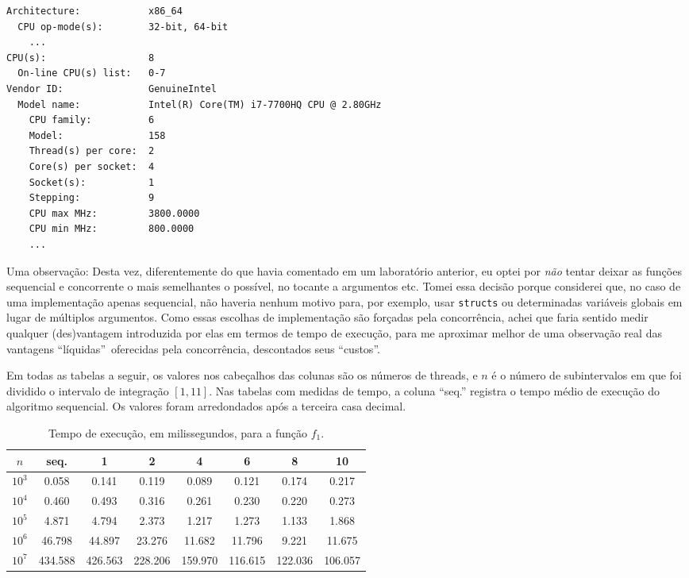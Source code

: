 \documentclass{article}
\begin{document}
\begin{lstlisting}
Architecture:            x86_64
  CPU op-mode(s):        32-bit, 64-bit
    ...
CPU(s):                  8
  On-line CPU(s) list:   0-7
Vendor ID:               GenuineIntel
  Model name:            Intel(R) Core(TM) i7-7700HQ CPU @ 2.80GHz
    CPU family:          6
    Model:               158
    Thread(s) per core:  2
    Core(s) per socket:  4
    Socket(s):           1
    Stepping:            9
    CPU max MHz:         3800.0000
    CPU min MHz:         800.0000
    ...
\end{lstlisting}

  Uma observação: Desta vez, diferentemente do que havia comentado em um laboratório anterior, eu optei por \emph{não} tentar deixar as funções sequencial e concorrente o mais semelhantes o possível, no tocante a argumentos etc. Tomei essa decisão porque considerei que, no caso de uma implementação apenas sequencial, não haveria nenhum motivo para, por exemplo, usar \texttt{structs} ou determinadas variáveis globais em lugar de múltiplos argumentos. Como essas escolhas de implementação são forçadas pela concorrência, achei 
  que faria sentido medir qualquer (des)vantagem introduzida por elas 
  em termos de tempo de execução, para me aproximar melhor de uma 
  observação real das vantagens ``líquidas''\ oferecidas pela concorrência, descontados seus ``custos''.

  Em todas as tabelas a seguir, os valores nos cabeçalhos das colunas são os números de threads, e $n$ é o número de subintervalos em que foi dividido o intervalo de integração $[1, 11]$. Nas tabelas com medidas de tempo, a coluna ``seq.'' registra o tempo médio de execução do algoritmo sequencial. Os valores foram arredondados após a terceira casa decimal.

  \begin{table}[h!]
    \centering
    \begin{tabular}{||c c c c c c c c||}
      \hline
      $n$ & seq. & 1 & 2 & 4 & 6 & 8 & 10 \\ 
      \hline \hline
      $10^{3}$ & 0.058 & 0.141 & 0.119 & 0.089 & 0.121 & 0.174 & 0.217 \\ 
      \hline 
      $10^{4}$ & 0.460 & 0.493 & 0.316 & 0.261 & 0.230 & 0.220 & 0.273 \\ 
      \hline 
      $10^{5}$ & 4.871 & 4.794 & 2.373 & 1.217 & 1.273 & 1.133 & 1.868 \\ 
      \hline 
      $10^{6}$ & 46.798 & 44.897 & 23.276 & 11.682 & 11.796 & 9.221 & 11.675 \\ 
      \hline 
      $10^{7}$ & 434.588 & 426.563 & 228.206 & 159.970 & 116.615 & 122.036 & 106.057 \\ 
      \hline 
    \end{tabular}
    \caption{Tempo de execução, em milissegundos, para a função $f_1$.}
    \label{f1t}
  \end{table}
\end{document}
